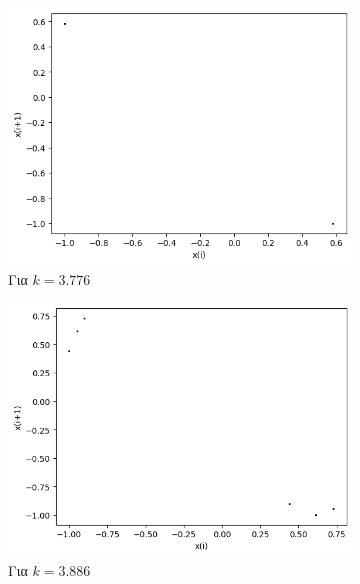 \begin{figure}[ht]
\begin{subfigure}[b]{0.4\textwidth}
		\includegraphics[width=\textwidth]{LateX images/cheb q=0.8/g11}
		\caption{Για $k=3.776$}
		\label{f:k138}
	\end{subfigure}
	\hfill
	\begin{subfigure}[b]{0.4\textwidth}
		\centering
		\includegraphics[width=\textwidth]{LateX images/cheb q=0.8/g12}
		\caption{Για $k=3.886$}
		\label{f:k139}
	\end{subfigure}
	\hfill
	\begin{subfigure}[b]{0.4\textwidth}
		\centering

\end{subfigure}
\end{figure}
